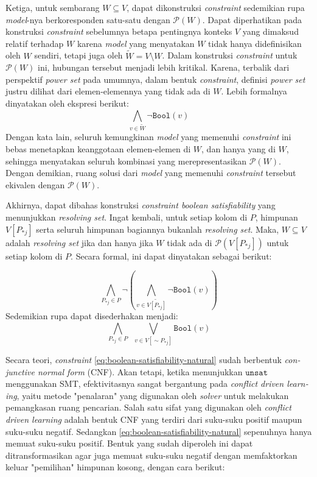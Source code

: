 \documentclass[10pt,twocolumn]{article}
\newcommand{\foreign}[1]{\foreignlanguage{english}{\textit{#1}}}
\def\boolmap{\mathtt{Bool}}
\def\Pcal{\mathcal{P}}
\def\unsat{\mathtt{unsat}}
\begin{document}
Ketiga, untuk sembarang \(W \subseteq V\), dapat dikonstruksi \foreign{constraint} sedemikian rupa \foreign{model}-nya berkoresponden satu-satu dengan \(\Pcal(W)\). Dapat diperhatikan pada konstruksi \foreign{constraint} sebelumnya betapa pentingnya konteks \(V\) yang dimaksud relatif terhadap \(W\) karena \foreign{model} yang menyatakan \(W\) tidak hanya didefinisikan oleh \(W\) sendiri, tetapi juga oleh \(\widetilde{W} = V \setminus W\). Dalam konstruksi \foreign{constraint} untuk \(\Pcal(W)\) ini, hubungan tersebut menjadi lebih kritikal. Karena, terbalik dari perspektif \foreign{power set} pada umumnya, dalam bentuk \foreign{constraint}, definisi \foreign{power set} justru dilihat dari elemen-elemennya yang tidak ada di \(W\). Lebih formalnya dinyatakan oleh ekspresi berikut:
\[
	\bigwedge \limits_{\displaystyle v \in \widetilde{W}} \neg \boolmap(v)
\]
Dengan kata lain, seluruh kemungkinan \foreign{model} yang memenuhi \foreign{constraint} ini bebas menetapkan keanggotaan elemen-elemen di \(W\), dan hanya yang di \(W\), sehingga menyatakan seluruh kombinasi yang merepresentasikan \(\Pcal(W)\). Dengan demikian, ruang solusi dari \foreign{model} yang memenuhi \foreign{constraint} tersebut ekivalen dengan \(\Pcal(W)\).

Akhirnya, dapat dibahas konstruksi \foreign{constraint boolean satisfiability} yang menunjukkan \foreign{resolving set}. Ingat kembali, untuk setiap kolom di \(P\), himpunan \(V[P_{*j}]\) serta seluruh himpunan bagiannya bukanlah \foreign{resolving set}. Maka, \(W \subseteq V\) adalah \foreign{resolving set} jika dan hanya jika \(W\) tidak ada di \(\Pcal(V[P_{*j}])\) untuk setiap kolom di \(P\). Secara formal, ini dapat dinyatakan sebagai berikut:

\[
	\bigwedge \limits_{\displaystyle P_{*j} \in P} \neg \left( \bigwedge \limits_{\displaystyle v \in \widetilde{V[P_{*j}]}} \neg \boolmap(v) \right)
\]
Sedemikian rupa dapat disederhakan menjadi:
\begin{equation}
	\bigwedge \limits_{\displaystyle P_{*j} \in P} \enspace \bigvee \limits_{\displaystyle v \in V[\sim\!P_{*j}]} \boolmap(v)
	\label{eq:boolean-satisfiability-natural}
\end{equation}

Secara teori, \foreign{constraint} \autoref{eq:boolean-satisfiability-natural} sudah berbentuk \foreign{conjunctive normal form} (CNF). Akan tetapi, ketika menunjukkan \(\unsat\) menggunakan SMT, efektivitasnya sangat bergantung pada \foreign{conflict driven learning}, yaitu metode "penalaran" yang digunakan oleh \foreign{solver} untuk melakukan pemangkasan ruang pencarian. Salah satu sifat yang digunakan oleh \foreign{conflict driven learning} adalah bentuk CNF yang terdiri dari suku-suku positif maupun suku-suku negatif. Sedangkan \autoref{eq:boolean-satisfiability-natural} sepenuhnya hanya memuat suku-suku positif. Bentuk yang sudah diperoleh ini dapat ditransformasikan agar juga memuat suku-suku negatif dengan memfaktorkan keluar "pemilihan" himpunan kosong, dengan cara berikut:
\end{document}
